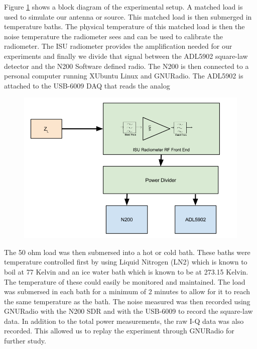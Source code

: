 Figure \ref{Exp1_Block} shows a block diagram of the experimental setup.  A matched load is used to simulate our antenna or source.  This matched load is then submerged in temperature baths.  The physical temperature of this matched load is then the noise temperature the radiometer sees and can be used to calibrate the radiometer.  The ISU radiometer provides the amplification needed for our experiments and finally we divide that signal between the ADL5902 square-law detector and the N200 Software defined radio.  The N200 is then connected to a personal computer running XUbuntu Linux and GNURadio.  The ADL5902 is attached to the USB-6009 DAQ that reads the analog 

{\begin{figure}[h!tb] \centering
\includegraphics[width=\textwidth]{Images/Exp_1_Setup.png}
\label{Exp1_Block}
\end{figure}
}

The 50 ohm load was then submersed into a hot or cold bath.  These baths were temperature controlled first by using Liquid Nitrogen (LN2) which is known to boil at 77 Kelvin and an ice water bath which is known to be at 273.15 Kelvin.  The temperature of these could easily be monitored and maintained.  The load was submersed in each bath for a minimum of 2 minutes to allow for it to reach the same temperature as the bath.  The noise measured was then recorded using GNURadio with the N200 SDR and with the USB-6009 to record the square-law data.  In addition to the total power measurements, the raw I-Q data was also recorded.  This allowed us to replay the experiment through GNURadio for further study.

